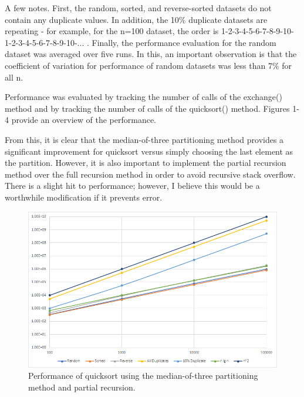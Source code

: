 \documentclass[11pt]{article}
\begin{document}
A few notes. First, the random, sorted, and reverse-sorted datasets do not contain any duplicate values. In addition, the 10\% duplicate datasets are repeating - for example, for the n=100 dataset, the order is 1-2-3-4-5-6-7-8-9-10-1-2-3-4-5-6-7-8-9-10-... . Finally, the performance evaluation for the random dataset was averaged over five runs. In this, an important observation is that the coefficient of variation for performance of random datasets was less than 7\% for all n.

Performance was evaluated by tracking the number of calls of the exchange() method and by tracking the number of calls of the quicksort() method. Figures 1-4 provide an overview of the performance.

From this, it is clear that the median-of-three partitioning method provides a significant improvement for quicksort versus simply choosing the last element as the partition. However, it is also important to implement the partial recursion method over the full recursion method in order to avoid recursive stack overflow. There is a slight hit to performance; however, I believe this would be a worthwhile modification if it prevents error.

\begin{figure} [htbp!]
	\centering
	\includegraphics[width=\textwidth]{3Part}
	\caption{Performance of quicksort using the median-of-three partitioning method and partial recursion. }
\end{figure}
\end{document}
